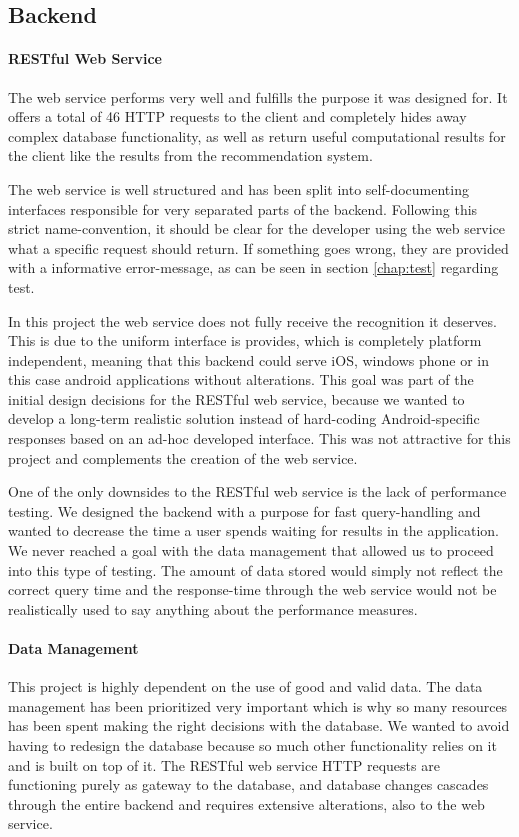 \subsection{Backend}
\label{subsec:evalbackend}
\paragraph{RESTful Web Service}
The web service performs very well and fulfills the purpose it was designed for. It offers a total of 46 HTTP requests to the client and completely hides away complex database functionality, as well as return useful computational results for the client like the results from the recommendation system. 

The web service is well structured and has been split into self-documenting interfaces responsible for very separated parts of the backend. Following this strict name-convention, it should be clear for the developer using the web service what a specific request should return. If something goes wrong, they are provided with a informative error-message, as can be seen in section \ref{chap:test} regarding test. 

In this project the web service does not fully receive the recognition it deserves. This is due to the uniform interface is provides, which is completely platform independent, meaning that this backend could serve iOS, windows phone or in this case android applications without alterations. This goal was part of the initial design decisions for the RESTful web service, because we wanted to develop a long-term realistic solution instead of hard-coding Android-specific responses based on an ad-hoc developed interface. This was not attractive for this project and complements the creation of the web service.

One of the only downsides to the RESTful web service is the lack of performance testing. We designed the backend with a purpose for fast query-handling and wanted to decrease the time a user spends waiting for results in the application. We never reached a goal with the data management that allowed us to proceed into this type of testing. The amount of data stored would simply not reflect the correct query time and the response-time through the web service would not be realistically used to say anything about the performance measures.

\paragraph{Data Management}
This project is highly dependent on the use of good and valid data. The data management has been prioritized very important which is why so many resources has been spent making the right decisions with the database. We wanted to avoid having to redesign the database because so much other functionality relies on it and is built on top of it. The RESTful web service HTTP requests are functioning purely as gateway to the database, and database changes cascades through the entire backend and requires extensive alterations, also to the web service. 

